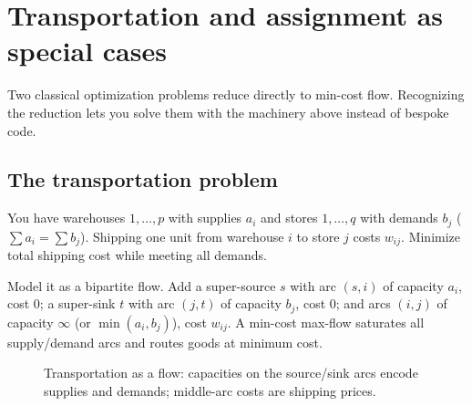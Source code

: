 \section{Transportation and assignment as special cases}
\label{ch14:special}

Two classical optimization problems reduce directly to min-cost flow. Recognizing the reduction lets you solve them with the machinery above instead of bespoke code.

\subsection{The transportation problem}

You have warehouses $1,\dots,p$ with supplies $a_i$ and stores $1,\dots,q$ with demands $b_j$ ($\sum a_i = \sum b_j$). Shipping one unit from warehouse $i$ to store $j$ costs $w_{ij}$. Minimize total shipping cost while meeting all demands.

Model it as a bipartite flow. Add a super-source $s$ with arc $(s,i)$ of capacity $a_i$, cost $0$; a super-sink $t$ with arc $(j,t)$ of capacity $b_j$, cost $0$; and arcs $(i,j)$ of capacity $\infty$ (or $\min(a_i,b_j)$), cost $w_{ij}$. A min-cost max-flow saturates all supply/demand arcs and routes goods at minimum cost.

\begin{figure}[H]
\centering
{}
\caption{Transportation as a flow: capacities on the source/sink arcs encode supplies and demands; middle-arc costs are shipping prices.}
\label{ch14:fig-transport}
\end{figure}


